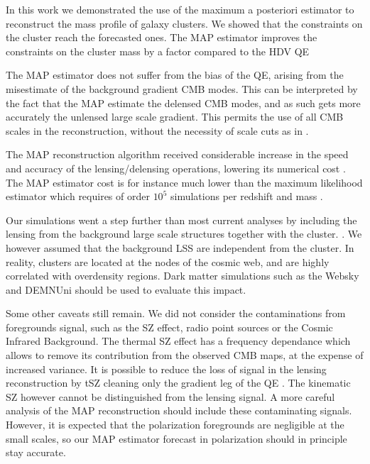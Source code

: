 \documentclass[prd, superscriptaddress, tightenlines, longbibliography, nofootinbib, eqsecnum, amsfonts, amsmath, floatfix, twocolumn, notitlepage]{revtex4-2}
\newcommand{\LL}[1]{{\color{orange}{LL: #1}}}
\begin{document}
\LL{tentative conclusion}
In this work we demonstrated the use of the maximum a posteriori estimator to reconstruct the mass profile of galaxy clusters. We showed that the constraints on the cluster reach the forecasted ones.
The MAP estimator improves the constraints on the cluster mass by a factor \LL{xxxx} compared to the HDV QE \cite{Hu:2007bt}

The MAP estimator does not suffer from the bias of the QE, arising from the misestimate of the background gradient CMB modes. This can be interpreted by the fact that the MAP estimate the delensed CMB modes, and as such gets more accurately the unlensed large scale gradient. 
This permits the use of all CMB scales in the reconstruction, without the necessity of scale cuts as in \cite{Hu:2007bt}. 

The MAP reconstruction algorithm received considerable increase in the speed and accuracy of the lensing/delensing operations, lowering its numerical cost \cite{Reinecke:2023gtp}. The MAP estimator cost is for instance much lower than the maximum likelihood estimator which requires of order $10^5$ simulations per redshift and mass \cite{Raghunathan:2017cle}. 

Our simulations went a step further than most current analyses by including the lensing from the background large scale structures together with the cluster. \LL{this increase the variance of the QE, but is negligible for the MAP??}. We however assumed that the background LSS are independent from the cluster. In reality, clusters are located at the nodes of the cosmic web, and are highly correlated with overdensity regions. Dark matter simulations such as the Websky \cite{Stein:2020its} and DEMNUni \cite{Carbone:2016nzj} should be used to evaluate this impact. 

Some other caveats still remain. We did not consider the contaminations from foregrounds signal, such as the SZ effect, radio point sources or the Cosmic Infrared Background. The thermal SZ effect has a frequency dependance which allows to remove its contribution from the observed CMB maps, at the expense of increased variance. It is possible to reduce the loss of signal in the lensing reconstruction by tSZ cleaning only the gradient leg of the QE \cite{Madhavacheril:2018bxi, DES:2018myw, Patil_2020}. The kinematic SZ however cannot be distinguished from the lensing signal. A more careful analysis of the MAP reconstruction should include these contaminating signals. However, it is expected that the polarization foregrounds are negligible at the small scales, so our MAP estimator forecast in polarization should in principle stay accurate. 
\end{document}
